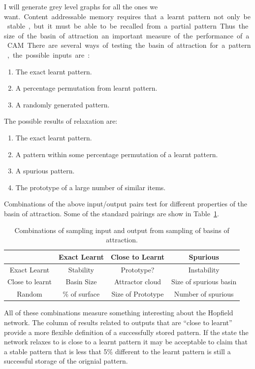 
\si{I will generate grey level graphs for all the ones we want.}

Content addressable memory requires that a learnt pattern not only be stable, but it must be able to be recalled from a partial pattern. Thus the size of the basin of attraction an important measure of the performance of a CAM.
There are several ways of testing the basin of attraction for a pattern, the possible inputs are:
\begin{enumerate}
\item The exact learnt pattern.
\item A percentage permutation from learnt pattern.
\item A randomly generated pattern.
\end{enumerate}
The possible results of relaxation are:
\begin{enumerate}
\item The exact learnt pattern.
\item A pattern within some percentage permutation of a learnt pattern.
\item A spurious pattern.
\item The prototype of a large number of similar items.
\end{enumerate}

Combinations of the above input/output pairs test for different properties of the basin of attraction.  Some of the standard pairings are show in Table~\ref{tab:CombSampling}.  
\begin{table}[ht]
	\begin{tabular}{c|c|c|c}
	                    & Exact Learnt   & Close to Learnt   & Spurious\\
		\hline
		Exact Learnt      & Stability      & Prototype?        & Instability \\
		Close to learnt	  & Basin Size     & Attractor cloud   & Size of spurious basin \\
		Random            & \% of surface  & Size of Prototype & Number of spurious \\
	\end{tabular}
	\caption{Combinations of sampling input and output from sampling of basins of attraction.}
	\label{tab:CombSampling}
\end{table}

All of these combinations measure something interesting about the Hopfield network.  The column of results related to outputs that are ``close to learnt'' provide a more flexible definition of a successfully stored pattern.  If the state the network relaxes to is close to a learnt pattern it may be acceptable to claim that a stable pattern that is less that 5\% different to the learnt pattern is still a successful storage of the orignial pattern.

